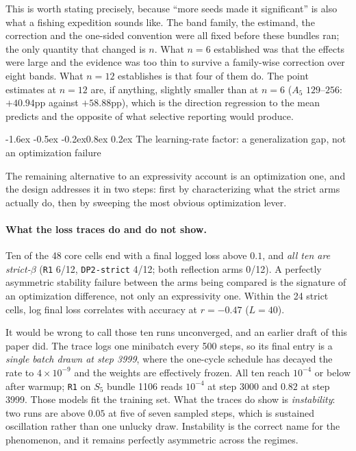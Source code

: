 \documentclass[10pt,twocolumn]{article}
\makeatletter
\renewcommand\subsection{\@startsection{subsection}{2}{\z@}%
  {-1.6ex \@plus -0.5ex \@minus -0.2ex}{0.8ex \@plus 0.2ex}%
  {\normalfont\normalsize\bfseries}}
\makeatother
\begin{document}
This is worth stating precisely, because ``more seeds made it significant'' is
also what a fishing expedition sounds like. The band family, the estimand, the
correction and the one-sided convention were all fixed before these bundles ran;
the only quantity that changed is $n$. What $n=6$ established was that the
effects were large and the evidence was too thin to survive a family-wise
correction over eight bands. What $n=12$ establishes is that four of them do.
The point estimates at $n=12$ are, if anything, slightly smaller than at $n=6$
($A_5$ $129$--$256$: $+40.94$pp against $+58.88$pp), which is the direction
regression to the mean predicts and the opposite of what selective reporting
would produce.

\subsection{The learning-rate factor: a generalization gap, not an optimization
failure}
\label{sec:trainability}

The remaining alternative to an expressivity account is an optimization one, and
the design addresses it in two steps: first by characterizing what the strict
arms actually do, then by sweeping the most obvious optimization lever.

\paragraph{What the loss traces do and do not show.}
Ten of the 48 core cells end with a final logged loss above $0.1$, and
\emph{all ten are strict-$\beta$} (\texttt{R1} 6/12, \texttt{DP2-strict} 4/12;
both reflection arms 0/12). A perfectly asymmetric stability failure between the
arms being compared is the signature of an optimization difference, not only an
expressivity one. Within the 24 strict cells, log final loss correlates with
accuracy at $r=-0.47$ ($L=40$).

It would be wrong to call those ten runs unconverged, and an earlier draft of
this paper did. The trace logs one minibatch every 500 steps, so its final entry
is a \emph{single batch drawn at step 3999}, where the one-cycle schedule has
decayed the rate to $4\times10^{-9}$ and the weights are effectively frozen. All
ten reach $10^{-4}$ or below after warmup; \texttt{R1} on $S_5$ bundle 1106 reads
$10^{-4}$ at step 3000 and $0.82$ at step 3999. Those models fit the training
set. What the traces do show is \emph{instability}: two runs are above $0.05$ at
five of seven sampled steps, which is sustained oscillation rather than one
unlucky draw. Instability is the correct name for the phenomenon, and it remains
perfectly asymmetric across the regimes.
\end{document}
